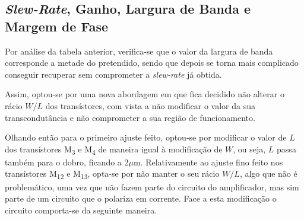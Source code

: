 \documentclass[11pt]{article}
\numberwithin{equation}{section}
\begin{document}
\subsection{\textit{Slew-Rate}, Ganho, Largura de Banda e Margem de Fase}

Por análise da tabela anterior, verifica-se que o valor da largura de banda corresponde a metade do pretendido, sendo que depois se torna mais complicado conseguir recuperar sem comprometer a \textit{slew-rate} já obtida. 

Assim, optou-se por uma nova abordagem em que fica decidido não alterar o rácio $W/L$ dos transístores, com vista a não modificar o valor da sua transcondutância e não comprometer a sua região de funcionamento.

Olhando então para o primeiro ajuste feito, optou-se por modificar o valor de $L$ dos transístores M\textsubscript{3} e M\textsubscript{4} de maneira igual à modificação de $W$, ou seja, $L$ passa também para o dobro, ficando a 2$\mu$m. Relativamente ao ajuste fino feito nos transístores M\textsubscript{12} e M\textsubscript{13}, opta-se por não manter o seu rácio $W/L$, algo que não é problemático, uma vez que não fazem parte do circuito do amplificador, mas sim parte de um circuito que o polariza em corrente. Face a esta modificação o circuito comporta-se da seguinte maneira. 

\vspace{-2mm}
\end{document}
